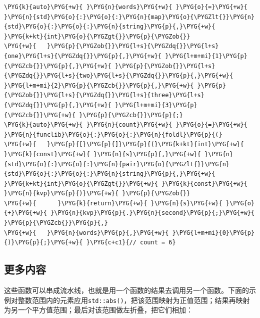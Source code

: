 \begin{itemize}
\begin{codeblockbg}
\begin{Verbatim}[commandchars=\\\{\},breaklines=true,breakanywhere=true,fontsize=\codefont,xleftmargin=17bp]
\PYG{k}{auto}\PYG{+w}{ }\PYG{n}{words}\PYG{+w}{ }\PYG{o}{=}\PYG{+w}{ }\PYG{n}{std}\PYG{o}{:}\PYG{o}{:}\PYG{n}{map}\PYG{o}{\PYGZlt{}}\PYG{n}{std}\PYG{o}{:}\PYG{o}{:}\PYG{n}{string}\PYG{p}{,}\PYG{+w}{ }\PYG{k+kt}{int}\PYG{o}{\PYGZgt{}}\PYG{p}{\PYGZob{}}
\PYG{+w}{   }\PYG{p}{\PYGZob{}}\PYG{l+s}{\PYGZdq{}}\PYG{l+s}{one}\PYG{l+s}{\PYGZdq{}}\PYG{p}{,}\PYG{+w}{ }\PYG{l+m+mi}{1}\PYG{p}{\PYGZcb{}}\PYG{p}{,}\PYG{+w}{ }\PYG{p}{\PYGZob{}}\PYG{l+s}{\PYGZdq{}}\PYG{l+s}{two}\PYG{l+s}{\PYGZdq{}}\PYG{p}{,}\PYG{+w}{ }\PYG{l+m+mi}{2}\PYG{p}{\PYGZcb{}}\PYG{p}{,}\PYG{+w}{ }\PYG{p}{\PYGZob{}}\PYG{l+s}{\PYGZdq{}}\PYG{l+s}{three}\PYG{l+s}{\PYGZdq{}}\PYG{p}{,}\PYG{+w}{ }\PYG{l+m+mi}{3}\PYG{p}{\PYGZcb{}}\PYG{+w}{ }\PYG{p}{\PYGZcb{}}\PYG{p}{;}
\PYG{k}{auto}\PYG{+w}{ }\PYG{n}{count}\PYG{+w}{ }\PYG{o}{=}\PYG{+w}{ }\PYG{n}{funclib}\PYG{o}{:}\PYG{o}{:}\PYG{n}{foldl}\PYG{p}{(}
\PYG{+w}{   }\PYG{p}{[}\PYG{p}{]}\PYG{p}{(}\PYG{k+kt}{int}\PYG{+w}{ }\PYG{k}{const}\PYG{+w}{ }\PYG{n}{s}\PYG{p}{,}\PYG{+w}{ }\PYG{n}{std}\PYG{o}{:}\PYG{o}{:}\PYG{n}{pair}\PYG{o}{\PYGZlt{}}\PYG{n}{std}\PYG{o}{:}\PYG{o}{:}\PYG{n}{string}\PYG{p}{,}\PYG{+w}{ }\PYG{k+kt}{int}\PYG{o}{\PYGZgt{}}\PYG{+w}{ }\PYG{k}{const}\PYG{+w}{ }\PYG{n}{kvp}\PYG{p}{)}\PYG{+w}{ }\PYG{p}{\PYGZob{}}
\PYG{+w}{      }\PYG{k}{return}\PYG{+w}{ }\PYG{n}{s}\PYG{+w}{ }\PYG{o}{+}\PYG{+w}{ }\PYG{n}{kvp}\PYG{p}{.}\PYG{n}{second}\PYG{p}{;}\PYG{+w}{ }\PYG{p}{\PYGZcb{}}\PYG{p}{,}
\PYG{+w}{   }\PYG{n}{words}\PYG{p}{,}\PYG{+w}{ }\PYG{l+m+mi}{0}\PYG{p}{)}\PYG{p}{;}\PYG{+w}{ }\PYG{c+c1}{// count = 6}
\end{Verbatim}
\end{codeblockbg}

\end{itemize}



\subsection{更多内容}



这些函数可以串成流水线，也就是用一个函数的结果去调用另一个函数。下面的示例对整数范围内的元素应用\texttt{std::\allowbreak{}abs()}，把该范围映射为正值范围；结果再映射为另一个平方值范围；最后对该范围做左折叠，把它们相加：


